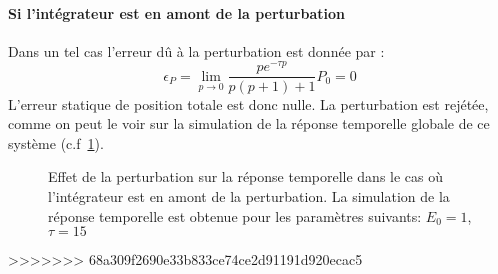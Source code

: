 \paragraph{Si l'intégrateur est en amont de la perturbation}
Dans un tel cas l'erreur dû à la perturbation est donnée par :
$$
\epsilon_P=\lim\limits_{p\to0}\dfrac{pe^{-\tau p}}{p(p+1)+1}P_0=0
$$
L'erreur statique de position totale est donc nulle. La perturbation
est rejétée, comme on peut le voir sur la simulation de la réponse
temporelle globale de ce système (c.f~\cref{fig-pert2}).
\begin{figure}[!h]
\centering
{}
\caption{Effet de la perturbation sur la réponse temporelle dans le cas
         où l'intégrateur est en amont de la perturbation. La simulation
         de la réponse temporelle est obtenue pour les paramètres suivants: 
         $E_0=1$, $\tau=15$\label{fig-pert2}}
\end{figure}
\clearpage
>>>>>>> 68a309f2690e33b833ce74ce2d91191d920ecac5
